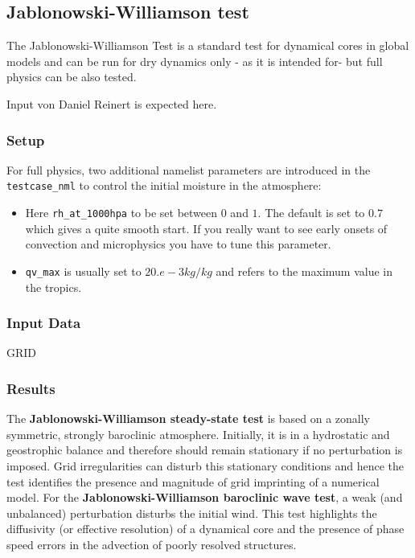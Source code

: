 \subsection{Jablonowski-Williamson test}

The Jablonowski-Williamson Test \citep{Jablonowski:2006} is a standard test for dynamical cores in global models and can be run for dry dynamics only - as it is intended for- but full physics can be also tested. 

Input von Daniel Reinert is expected here.

\subsubsection{Setup}

For full physics, two additional namelist parameters are introduced in the  \verb+testcase_nml+ to control the initial moisture in the atmosphere:
\begin{itemize}
\item Here \verb+rh_at_1000hpa+ to be set between $0$ and $1$. The default is set to $0.7$ which gives a quite smooth start. If you really want to see early onsets of convection and microphysics you have to tune this parameter.
\item \verb+qv_max+ is usually set to $20.e-3 kg/kg$ and refers to the maximum value in the tropics.
\end{itemize}

\subsubsection{Input Data}

GRID

\subsubsection{Results}

The \textbf{Jablonowski-Williamson steady-state test} is based on a zonally symmetric, strongly baroclinic atmosphere. Initially, it is in a hydrostatic and geostrophic balance and therefore should remain stationary if no perturbation is imposed. Grid irregularities can disturb this stationary conditions and hence the test identifies the presence and magnitude of grid imprinting of a numerical model.
For the \textbf{Jablonowski-Williamson baroclinic wave test}, a weak (and unbalanced) perturbation disturbs the initial wind. This test highlights the diffusivity (or effective resolution) of a dynamical core and the presence of phase speed errors in the advection of poorly resolved structures.

